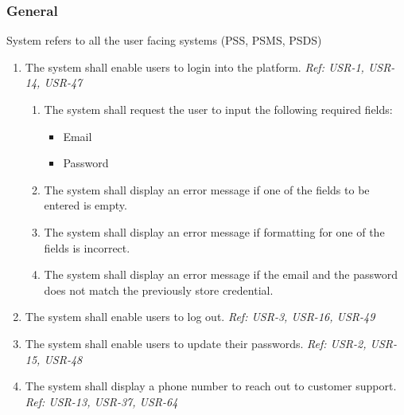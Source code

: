 \subsubsection{General}
System refers to all the user facing systems (PSS, PSMS, PSDS)
\begin{enumerate}[label=SY-\arabic*]
    \item The system shall enable users to login into the platform. 
    \newline \textit{Ref: USR-1, USR-14, USR-47}
    \begin{enumerate}[label=SY-1.\arabic*]
        \item The system shall request the user to input the following required 
        fields:
        \begin{itemize}
            \item Email
            \item Password
        \end{itemize}
        \item The system shall display an error message if one of the fields 
        to be entered is empty.
        \item The system shall display an error message if formatting for one 
        of the fields is incorrect.
        \item The system shall display an error message if the email and 
        the password does not match the previously store credential.
    \end{enumerate}
    \item The system shall enable users to log out. 
    \newline \textit{Ref: USR-3, USR-16, USR-49}
    \item The system shall enable users to update their passwords.
    \newline \textit{Ref: USR-2, USR-15, USR-48}
    \item The system shall display a phone number to reach out to customer 
    support. 
    \newline \textit{Ref: USR-13, USR-37, USR-64}
\end{enumerate}
\pagebreak
